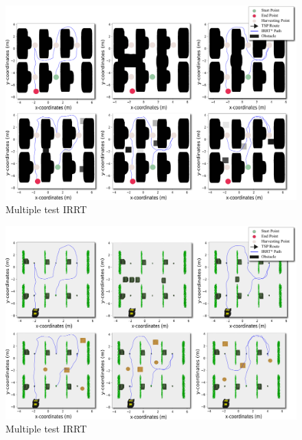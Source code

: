 \documentclass[conference]{IEEEtran}
\begin{document}
\begin{figure}[t!]
    \centering
    \includegraphics[width=\linewidth]{Images/rrt_all_tests_3.pdf}
    \caption{Multiple test IRRT }
    \label{fig:rgb1}
\end{figure}

\begin{figure}[t!]
    \centering
    \includegraphics[width=\linewidth]{Images/rrt_all_tests_4.pdf}
    \caption{Multiple test IRRT }
    \label{fig:rgb1}
\end{figure}
\end{document}
